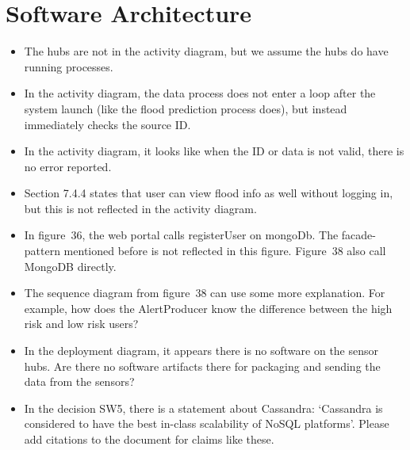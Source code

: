 \documentclass[a4paper,10pt]{article}
\begin{document}
\section{Software Architecture}
\begin{itemize}
\item The hubs are not in the activity diagram, but we assume the hubs do have running processes.

\item In the activity diagram, the data process does not enter a loop after the system launch (like the flood prediction process does), but instead immediately checks the source ID.

\item In the activity diagram, it looks like when the ID or data is not valid, there is no error reported.

\item Section 7.4.4 states that user can view flood info as well without logging in, but this is not reflected in the activity diagram.

\item In figure~36, the web portal calls registerUser on mongoDb. The facade-pattern mentioned before is not reflected in this figure. Figure~38 also call MongoDB directly.

\item The sequence diagram from figure~38 can use some more explanation. For example, how does the AlertProducer know the difference between the high risk and low risk users?

\item In the deployment diagram, it appears there is no software on the sensor hubs. Are there no software artifacts there for packaging and sending the data from the sensors?

\item In the decision SW5, there is a statement about Cassandra: `Cassandra is considered to have the best in-class scalability of NoSQL platforms'. Please add citations to the document for claims like these.

\end{itemize}
\end{document}
